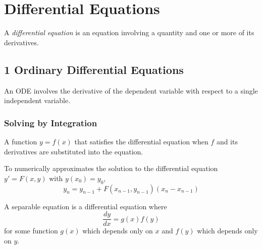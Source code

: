 
\chapter{Differential Equations}

A \textit{differential equation} is an equation involving a quantity and one or more of its derivatives.

\section*{1 Ordinary Differential Equations}

An ODE involves the derivative of the dependent variable with respect to a single independent variable.

\subsection{Solving by Integration}

\begin{definition} A function $y = f(x)$ that satisfies the differential equation when $f$ and its derivatives are substituted into the equation.
\end{definition}

  

\begin{procedure} To numerically approximates the solution to the differential equation $y' = F(x, y)$ with $y(x_0) = y_0$,
  \[
    y_n = y_{n - 1} + F(x_{n-1}, y_{n - 1})(x_n - x_{n - 1})
  \]
\end{procedure}

\begin{definition} A separable equation is a differential equation where
  \[
    \frac{dy}{dx} = g(x)f(y)
  \]
  for some function $g(x)$ which depends only on $x$ and $f(y)$ which depends only on $y$.
\end{definition}

